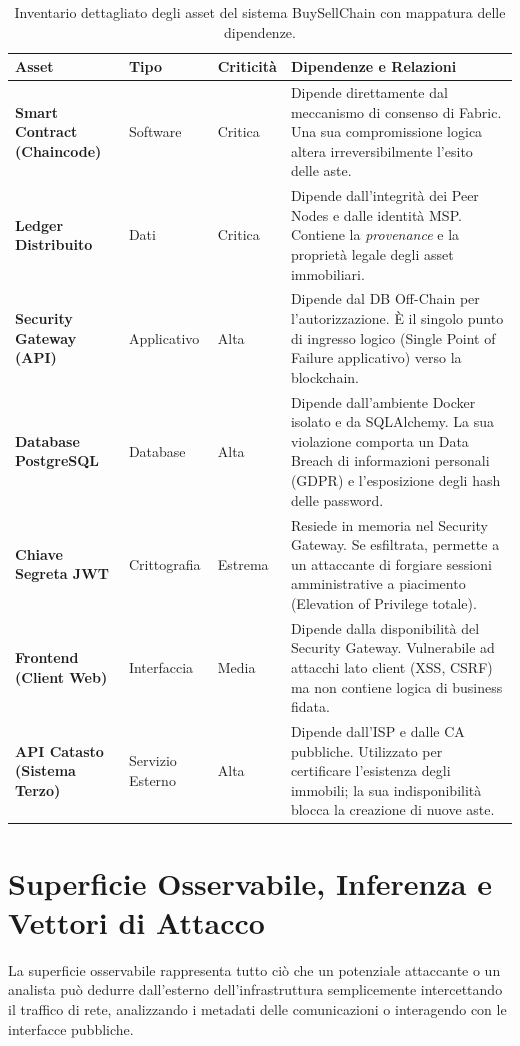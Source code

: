 \documentclass[12pt,a4paper]{article}
\begin{document}
\begin{table}[h]
\centering
\footnotesize
\renewcommand{\arraystretch}{1.4}
\begin{tabularx}{\textwidth}{>{\hsize=0.25\hsize\bfseries}X >{\hsize=0.15\hsize}X >{\hsize=0.15\hsize}X >{\hsize=0.45\hsize}X}
\toprule
Asset & Tipo & Criticità & Dipendenze e Relazioni \\
\midrule
Smart Contract (Chaincode) & Software & Critica & Dipende direttamente dal meccanismo di consenso di Fabric. Una sua compromissione logica altera irreversibilmente l'esito delle aste. \\
Ledger Distribuito & Dati & Critica & Dipende dall'integrità dei Peer Nodes e dalle identità MSP. Contiene la \textit{provenance} e la proprietà legale degli asset immobiliari. \\
Security Gateway (API) & Applicativo & Alta & Dipende dal DB Off-Chain per l'autorizzazione. È il singolo punto di ingresso logico (Single Point of Failure applicativo) verso la blockchain. \\
Database PostgreSQL & Database & Alta & Dipende dall'ambiente Docker isolato e da SQLAlchemy. La sua violazione comporta un Data Breach di informazioni personali (GDPR) e l'esposizione degli hash delle password. \\
Chiave Segreta JWT & Crittografia & Estrema & Resiede in memoria nel Security Gateway. Se esfiltrata, permette a un attaccante di forgiare sessioni amministrative a piacimento (Elevation of Privilege totale). \\
Frontend (Client Web) & Interfaccia & Media & Dipende dalla disponibilità del Security Gateway. Vulnerabile ad attacchi lato client (XSS, CSRF) ma non contiene logica di business fidata. \\
API Catasto (Sistema Terzo) & Servizio Esterno & Alta & Dipende dall'ISP e dalle CA pubbliche. Utilizzato per certificare l'esistenza degli immobili; la sua indisponibilità blocca la creazione di nuove aste. \\
\bottomrule
\end{tabularx}
\caption{Inventario dettagliato degli asset del sistema BuySellChain con mappatura delle dipendenze.}
\end{table}

\newpage

\section{Superficie Osservabile, Inferenza e Vettori di Attacco}
La superficie osservabile rappresenta tutto ciò che un potenziale attaccante o un analista può dedurre dall'esterno dell'infrastruttura semplicemente intercettando il traffico di rete, analizzando i metadati delle comunicazioni o interagendo con le interfacce pubbliche. 
\end{document}
